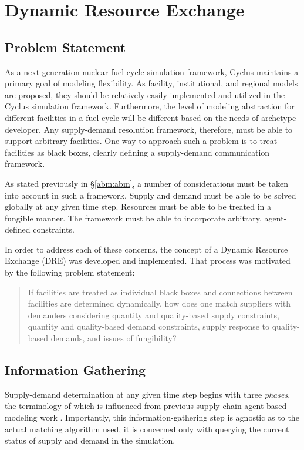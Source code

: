 
\section{Dynamic Resource Exchange}\label{abm:dre}

\subsection{Problem Statement}

As a next-generation nuclear fuel cycle simulation framework, Cyclus maintains a
primary goal of modeling flexibility. As facility, institutional, and regional
models are proposed, they should be relatively easily implemented and utilized
in the Cyclus simulation framework. Furthermore, the level of modeling
abstraction for different facilities in a fuel cycle will be different based on
the needs of archetype developer. Any supply-demand resolution framework,
therefore, must be able to support arbitrary facilities. One way to approach
such a problem is to treat facilities as black boxes, clearly defining a
supply-demand communication framework.

As stated previously in \S \ref{abm:abm}, a number of considerations must be
taken into account in such a framework. Supply and demand must be able to be
solved globally at any given time step. Resources must be able to be treated in
a fungible manner. The framework must be able to incorporate arbitrary,
agent-defined constraints. 

In order to address each of these concerns, the concept of a Dynamic Resource
Exchange (DRE) was developed and implemented. That process was motivated by the
following problem statement:

\begin{quote}
    If facilities are treated as individual black boxes and connections between
    facilities are determined dynamically, how does one match suppliers with
    demanders considering quantity and quality-based supply constraints,
    quantity and quality-based demand constraints, supply response to
    quality-based demands, and issues of fungibility?
\end{quote}

\subsection{Information Gathering}\label{abm:dre:info}

Supply-demand determination at any given time step begins with three
\textit{phases}, the terminology of which is influenced from previous supply
chain agent-based modeling work \cite{julka_agent-based_2002}. Importantly, this
information-gathering step is agnostic as to the actual matching algorithm used,
it is concerned only with querying the current status of supply and demand in
the simulation.

